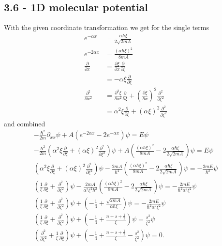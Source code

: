 \documentclass[../main.tex]{subfiles}
\begin{document}
\subsection{3.6 - 1D molecular potential}
With the given coordinate transformation we get for the single terms
\begin{align}
    e^{-\alpha x}&=\frac{\alpha\hbar\xi}{2\sqrt{2mA}}\\
    e^{-2\alpha x}&=\frac{(\alpha\hbar\xi)^2}{8mA}\\
    \frac{\partial}{\partial x}&=\frac{\partial\xi}{\partial x}\frac{\partial}{\partial\xi}\\
    &=-\alpha\xi\frac{\partial}{\partial\xi}\\
    \frac{\partial^2}{\partial x^2}&=\frac{\partial^2\xi}{\partial x^2}\frac{\partial}{\partial\xi}+\left(\frac{\partial\xi}{\partial x}\right)^2\frac{\partial^2}{\partial\xi^2}\\
    &=\alpha^2\xi\frac{\partial}{\partial\xi}+(\alpha\xi)^2\frac{\partial^2}{\partial\xi^2}
\end{align}
and combined
\begin{align}
    -\frac{\hbar^2}{2m}\partial_{xx}\psi+A(e^{-2\alpha x}-2e^{-\alpha x})\psi=E\psi\\
    -\frac{\hbar^2}{2m}\left(\alpha^2\xi\frac{\partial}{\partial\xi}+(\alpha\xi)^2\frac{\partial^2}{\partial\xi^2}\right)\psi+A\left(\frac{(\alpha\hbar\xi)^2}{8mA}-2\frac{\alpha\hbar\xi}{2\sqrt{2mA}}\right)\psi=E\psi\\
    \left(\alpha^2\xi\frac{\partial}{\partial\xi}+(\alpha\xi)^2\frac{\partial^2}{\partial\xi^2}\right)\psi-\frac{2mA}{\hbar^2}\left(\frac{(\alpha\hbar\xi)^2}{8mA}-2\frac{\alpha\hbar\xi}{2\sqrt{2mA}}\right)\psi=-\frac{2mE}{\hbar^2}\psi\\
    \left(\frac{1}{\xi}\frac{\partial}{\partial\xi}+\frac{\partial^2}{\partial\xi^2}\right)\psi-\frac{2mA}{\alpha^2\xi^2\hbar^2}\left(\frac{(\alpha\hbar\xi)^2}{8mA}-2\frac{\alpha\hbar\xi}{2\sqrt{2mA}}\right)\psi=-\frac{2mE}{\hbar^2\alpha^2\xi^2}\psi\\
    \left(\frac{1}{\xi}\frac{\partial}{\partial\xi}+\frac{\partial^2}{\partial\xi^2}\right)\psi+\left(-\frac{1}{4}+\frac{\sqrt{2mA}}{\alpha\hbar\xi}\right)\psi=-\frac{2mE}{\hbar^2\alpha^2\xi^2}\psi\\
    \left(\frac{1}{\xi}\frac{\partial}{\partial\xi}+\frac{\partial^2}{\partial\xi^2}\right)\psi+\left(-\frac{1}{4}+\frac{n+s+\frac{1}{2}}{\xi}\right)\psi=\frac{s^2}{\xi^2}\psi\\
    \left(\frac{\partial^2}{\partial\xi^2}+\frac{1}{\xi}\frac{\partial}{\partial\xi}\right)\psi+\left(-\frac{1}{4}+\frac{n+s+\frac{1}{2}}{\xi}-\frac{s^2}{\xi^2}\right)\psi=0.
\end{align}
\end{document}
